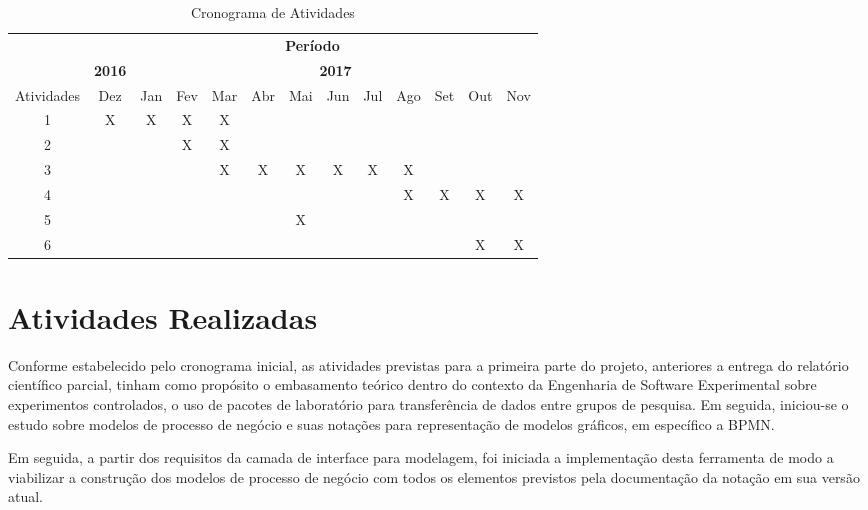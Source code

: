 \begin{table}[htbp]
\centering 
\caption{Cronograma de Atividades}
\label{tab_cronograma}
\small
\begin{tabular}
{|c|c|c|c|c|c|c|c|c|c|c|c|c|} \cline{2-13}
\multicolumn{1}{c|}{}&\multicolumn{12}{c|}{\textbf{Período}}
 \\
\cline{2-13}
\multicolumn{1}{c|}{}&\multicolumn{1}{c|}{\textbf{2016}} &\multicolumn{11}{c|}{\textbf{2017}} \\
\hline Atividades & Dez & Jan & Fev & Mar & Abr & Mai & Jun & Jul & Ago & Set & Out & Nov \\
\hline         1  & X   & X   &  X  &  X  &     &     &     &     &     &     &     &     \\
\hline         2  &     &     &  X  &  X  &     &     &     &     &     &     &     &     \\
\hline         3  &     &     &     &  X  &  X  &  X  &  X  &  X  &  X  &     &     &     \\
\hline         4  &     &     &     &     &     &     &     &     &  X  &  X  &  X  &  X  \\
\hline         5  &     &     &     &     &     &  X  &     &     &     &     &     &     \\
\hline         6  &     &     &     &     &     &     &     &     &     &     &  X  &  X  \\
\hline
\end{tabular}
\normalsize
\end{table}

\section{Atividades Realizadas}

Conforme estabelecido pelo cronograma inicial, as atividades previstas para a primeira parte do projeto, anteriores a entrega do relatório científico parcial, tinham como propósito o embasamento teórico dentro do contexto da Engenharia de Software Experimental sobre experimentos controlados, o uso de pacotes de laboratório para transferência de dados entre grupos de pesquisa. Em seguida, iniciou-se o estudo sobre modelos de processo de negócio e suas notações para representação de modelos gráficos, em específico a BPMN.

Em seguida, a partir dos requisitos da camada de interface para modelagem, foi iniciada a implementação desta ferramenta de modo a viabilizar a construção dos modelos de processo de negócio com todos os elementos previstos pela documentação da notação em sua versão atual.


